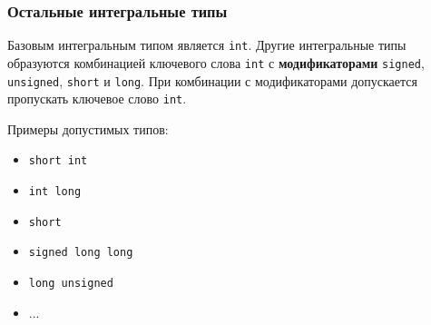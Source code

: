 \documentclass[compress, 8pt]{beamer}
\begin{document}
\begin{frame}[fragile]

    \frametitle{Остальные интегральные типы}

    Базовым интегральным типом является \verb|int|.
    Другие интегральные типы образуются комбинацией
    ключевого слова \verb|int| с \textbf{модификаторами}
    \verb|signed|, \verb|unsigned|, \verb|short| и \verb|long|.
    При комбинации с модификаторами допускается
    пропускать ключевое слово \verb|int|.

    \hfill \break
    Примеры допустимых типов:

    \begin{itemize}
        \item \verb|short int|
        \item \verb|int long|
        \item \verb|short|
        \item \verb|signed long long|
        \item \verb|long unsigned|
        \item ...
    \end{itemize}

\end{frame}
\end{document}
